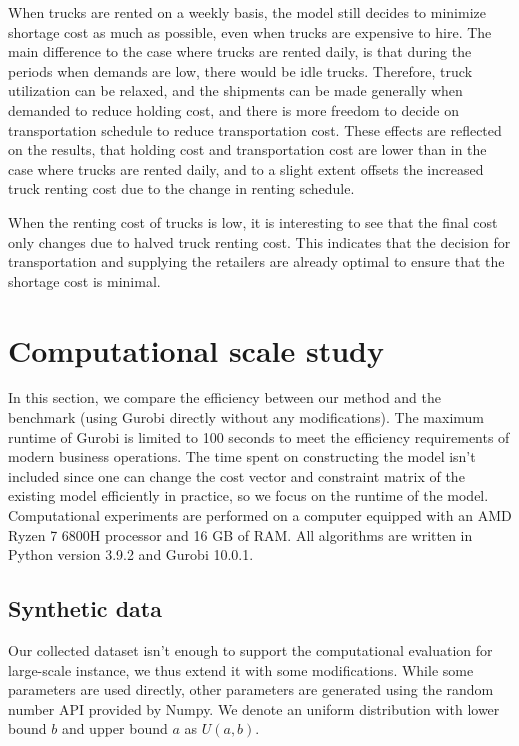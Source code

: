 \documentclass[a4paper,12pt]{article}
\begin{document}
When trucks are rented on a weekly basis, the model still decides to minimize shortage cost as much as possible, even when trucks are expensive to hire. The main difference to the case where trucks are rented daily, is that during the periods when demands are low, there would be idle trucks. Therefore, truck utilization can be relaxed, and the shipments can be made generally when demanded to reduce holding cost, and there is more freedom to decide on transportation schedule to reduce transportation cost. These effects are reflected on the results, that holding cost and transportation cost are lower than in the case where trucks are rented daily, and to a slight extent offsets the increased truck renting cost due to the change in renting schedule.

When the renting cost of trucks is low, it is interesting to see that the final cost only changes due to halved truck renting cost. This indicates that the decision for transportation and supplying the retailers are already optimal to ensure that the shortage cost is minimal.








\section{Computational scale study}\label{sec:computational-scale-study}

In this section, we compare the efficiency between our method and the benchmark (using Gurobi directly without any modifications). The maximum runtime of Gurobi is limited to 100 seconds to meet the efficiency requirements of modern business operations. The time spent on constructing the model isn't included since one can change the cost vector and constraint matrix of the existing model efficiently in practice, so we focus on the runtime of the model. Computational experiments are performed on a computer equipped with an AMD Ryzen 7 6800H processor and 16 GB of RAM. All algorithms are written in Python version 3.9.2 and Gurobi 10.0.1.

\subsection{Synthetic data}

Our collected dataset isn't enough to support the computational evaluation for large-scale instance, we thus extend it with some modifications. While some parameters are used directly, other parameters are generated using the random number API provided by Numpy. We denote an uniform distribution with lower bound $b$ and upper bound $a$ as $U(a, b)$.
\end{document}
